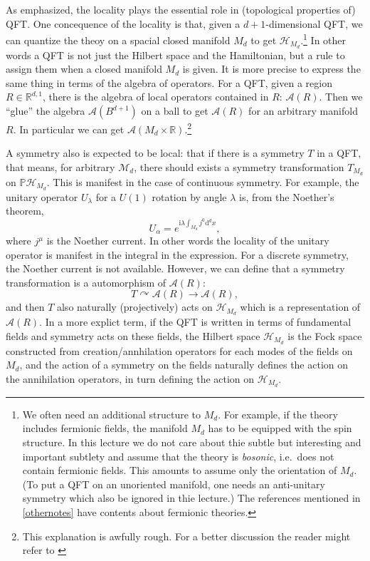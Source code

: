 \documentclass[
]{scrartcl}
\numberwithin{equation}{section}
\theoremstyle{definition}
\theoremstyle{definition}
\theoremstyle{definition}
\theoremstyle{definition}
\theoremstyle{remark}
\begin{document}
As emphasized, the locality plays the essential role in (topological properties of) QFT.
One concequence of the locality is that,
given a \(d+1\)-dimensional QFT, we can quantize the theoy on a spacial closed manifold \(M_d\) to get \(\mathcal{H}_{M_d}\).\footnote{We often need an additional structure to \(M_d\). For example, if the theory includes fermionic fields, the manifold \(M_d\) has to be equipped with the spin structure. In this lecture we do not care about thie subtle but interesting and important subtlety and assume that the theory is \emph{bosonic}, i.e.~does not contain fermionic fields. This amounts to assume only the orientation of \(M_d\). (To put a QFT on an unoriented manifold, one needs an anti-unitary symmetry which also be ignored in thie lecture.) The references mentioned in \ref{othernotes} have contents about fermionic theories.}
In other words a QFT is not just the Hilbert space and the Hamiltonian, but a rule to assign them when a closed manifold \(M_d\) is given.
It is more precise to express the same thing in terms of the algebra of operators.
For a QFT, given a region \(R \in \mathbb{R}^{d,1}\), there is the algebra of local operators contained in \(R\): \(\mathcal{A}(R)\).
Then we ``glue'' the algebra \(\mathcal{A}(B^{d+1})\) on a ball to get \(\mathcal{A}(R)\) for an arbitrary manifold \(R\). In particular we can get \(\mathcal{A}(M_d\times \mathbb{R})\).\footnote{This explanation is awfully rough. For a better discussion the reader might refer to \textcite{Witten:2021jzq}}

A symmetry also is expected to be local: that if there is a symmetry \(T\) in a QFT, that means, for arbitrary \(\mathcal{M}_d\),
there should exists a symmetry transformation \(T_{M_d}\) on \(\mathbb{P}\mathcal{H}_{M_d}\).
This is manifest in the case of continuous symmetry.
For example, the unitary operator \(U_\lambda\) for a \(U(1)\) rotation by angle \(\lambda\) is, from the Noether's theorem,
\begin{equation}
    \label{eq:Noether}
    U_\alpha = e^{\mathrm{i}\lambda \int_{M_d}j^0 \mathrm{d}^dx},
\end{equation}
where \(j^\mu\) is the Noether current.
In other words the locality of the unitary operator is manifest in the integral in the expression.
For a discrete symmetry, the Noether current is not available.
However, we can define that a symmetry transformation is a automorphism of \(\mathcal{A}(R)\):
\begin{equation}
    \label{eq:TonAR}
    T \curvearrowright \mathcal{A}(R) \to \mathcal{A}(R),
\end{equation}
and then \(T\) also naturally (projectively) acts on \(\mathcal{H}_{M_d}\) which is a representation of \(\mathcal{A}(R)\).
In a more explict term, if the QFT is written in terms of fundamental fields and symmetry acts on these fields,
the Hilbert space \(\mathcal{H}_{M_d}\) is the Fock space constructed from creation/annhilation operators for each modes of the fields on \(M_d\),
and the action of a symmetry on the fields naturally defines the action on the annihilation operators, in turn defining the action on \(\mathcal{H}_{M_d}\).
\end{document}
